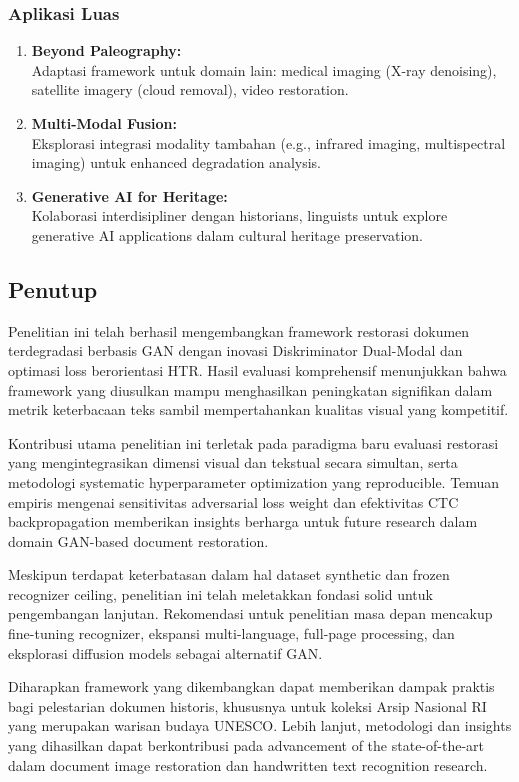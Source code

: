 \documentclass[12pt,a4paper]{article}
\begin{document}
\subsubsection{Aplikasi Luas}

\begin{enumerate}[label=\arabic*., leftmargin=0.5cm]
    \item \textbf{Beyond Paleography:} \\
    Adaptasi framework untuk domain lain: medical imaging (X-ray denoising), satellite imagery (cloud removal), video restoration.
    
    \item \textbf{Multi-Modal Fusion:} \\
    Eksplorasi integrasi modality tambahan (e.g., infrared imaging, multispectral imaging) untuk enhanced degradation analysis.
    
    \item \textbf{Generative AI for Heritage:} \\
    Kolaborasi interdisipliner dengan historians, linguists untuk explore generative AI applications dalam cultural heritage preservation.
\end{enumerate}

\subsection{Penutup}
\label{subsec:penutup}
\vspace{0.8em}

Penelitian ini telah berhasil mengembangkan framework restorasi dokumen terdegradasi berbasis GAN dengan inovasi Diskriminator Dual-Modal dan optimasi loss berorientasi HTR. Hasil evaluasi komprehensif menunjukkan bahwa framework yang diusulkan mampu menghasilkan peningkatan signifikan dalam metrik keterbacaan teks sambil mempertahankan kualitas visual yang kompetitif.

Kontribusi utama penelitian ini terletak pada paradigma baru evaluasi restorasi yang mengintegrasikan dimensi visual dan tekstual secara simultan, serta metodologi systematic hyperparameter optimization yang reproducible. Temuan empiris mengenai sensitivitas adversarial loss weight dan efektivitas CTC backpropagation memberikan insights berharga untuk future research dalam domain GAN-based document restoration.

Meskipun terdapat keterbatasan dalam hal dataset synthetic dan frozen recognizer ceiling, penelitian ini telah meletakkan fondasi solid untuk pengembangan lanjutan. Rekomendasi untuk penelitian masa depan mencakup fine-tuning recognizer, ekspansi multi-language, full-page processing, dan eksplorasi diffusion models sebagai alternatif GAN.

Diharapkan framework yang dikembangkan dapat memberikan dampak praktis bagi pelestarian dokumen historis, khususnya untuk koleksi Arsip Nasional RI yang merupakan warisan budaya UNESCO. Lebih lanjut, metodologi dan insights yang dihasilkan dapat berkontribusi pada advancement of the state-of-the-art dalam document image restoration dan handwritten text recognition research.
\end{document}
